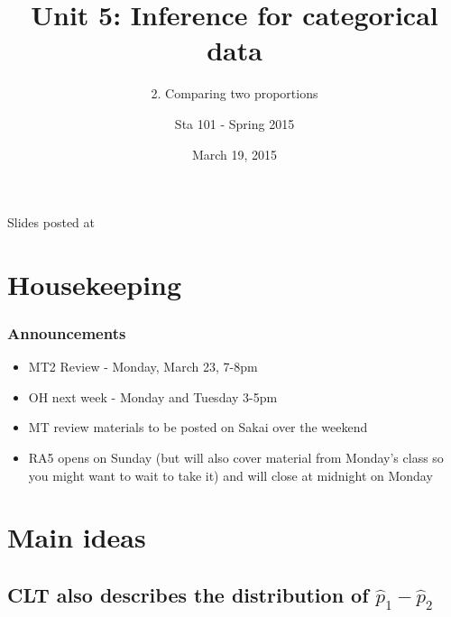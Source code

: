 \documentclass[slidestop,compress,mathserif,12pt,t,professionalfonts,xcolor=table]{beamer}
\title{Unit 5: Inference for categorical data}
\subtitle{2. Comparing two proportions}
\author{Sta 101 - Spring 2015}
\date{March 19, 2015}
\institute{Duke University, Department of Statistical Science}
\begin{document}


\begin{frame}[plain]

\titlepage
\vfill
{\scriptsize {} \hfill Slides posted at  \webLink{\CourseSite}{\CourseSite}}
\addtocounter{framenumber}{-1} 

\end{frame}


\section{Housekeeping}


\begin{frame}
\frametitle{Announcements}

\begin{itemize}

\item MT2 Review - Monday, March 23, 7-8pm

\item OH next week - Monday and Tuesday 3-5pm

\item MT review materials to be posted on Sakai over the weekend

\item RA5 opens on Sunday (but will also cover material from Monday's class so you might want to wait to take it) and will close at midnight on Monday

\end{itemize}

\end{frame}


\section{Main ideas}


\subsection{CLT also describes the distribution of $\hat{p}_1 - \hat{p}_2$}
\label{mi1}
\end{document}
